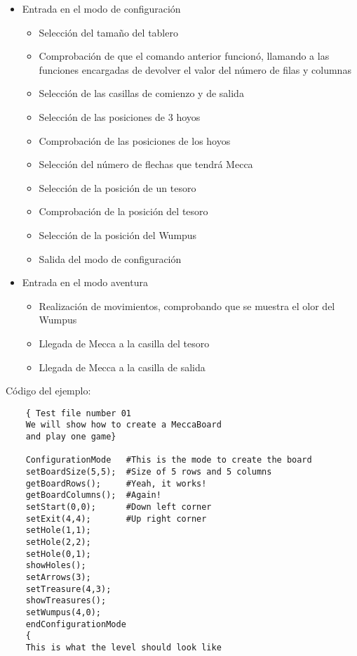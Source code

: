\documentclass[a4paper,12pt,twoside,openright]{report}
\begin{document}
{  \begin{itemize}
   \item Entrada en el modo de configuración
   \begin{itemize}
    \item Selección del tamaño del tablero
    \item Comprobación de que el comando anterior funcionó, llamando a las funciones 
    encargadas de devolver el valor del número de filas y columnas
    \item Selección de las casillas de comienzo y de salida
    \item Selección de las posiciones de 3 hoyos
    \item Comprobación de las posiciones de los hoyos
    \item Selección del número de flechas que tendrá Mecca
    \item Selección de la posición de un tesoro
    \item Comprobación de la posición del tesoro
    \item Selección de la posición del Wumpus
    \item Salida del modo de configuración
    \end{itemize}
   \item Entrada en el modo aventura
      \begin{itemize}
      \item Realización de movimientos, comprobando que se muestra el 
      olor del Wumpus
      \item Llegada de Mecca a la casilla del tesoro
      \item Llegada de Mecca a la casilla de salida
      \end{itemize}
   \end{itemize}
  
  Código del ejemplo:
  \begin{lstlisting}
    { Test file number 01
    We will show how to create a MeccaBoard 
    and play one game}

    ConfigurationMode   #This is the mode to create the board
    setBoardSize(5,5);  #Size of 5 rows and 5 columns
    getBoardRows();     #Yeah, it works!
    getBoardColumns();  #Again!
    setStart(0,0);      #Down left corner
    setExit(4,4);	    #Up right corner
    setHole(1,1);	    
    setHole(2,2);
    setHole(0,1);
    showHoles();
    setArrows(3);
    setTreasure(4,3);
    showTreasures();
    setWumpus(4,0);
    endConfigurationMode
    {
    This is what the level should look like


\end{lstlisting}}
\end{document}
